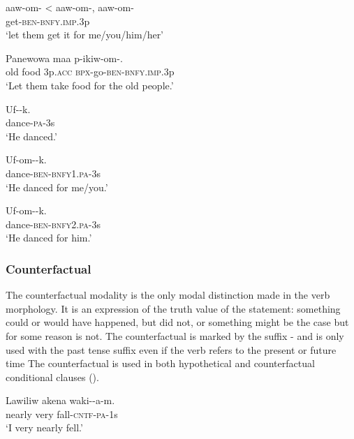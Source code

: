 \ea%
\label{ex:3:x1750}
\gll aaw-om- {{\textless} aaw-om-}, aaw-om- \\
get-\textsc{ben}-\textsc{bnfy}.\textsc{imp}.3p\\
\glt`let them get it for me/you/him/her'
\z

\ea%
\label{ex:3:x445}
\gll Panewowa maa  p-ikiw-om-. \\
old food 3p.\textsc{acc} \textsc{bpx}-go-\textsc{ben}-\textsc{bnfy}.\textsc{imp}.3p\\
\glt`Let them take food for the old people.'
\z

\ea%
\label{ex:3:x494}
\gll Uf--k. \\
dance-\textsc{pa}-3s\\
\glt`He danced.'
\z

\ea%
\label{ex:3:x495}
\gll Uf-om--k. \\
dance-\textsc{ben}-\textsc{bnfy}1.\textsc{pa}-3s\\
\glt`He danced for me/you.'
\z

\ea%
\label{ex:3:x496}
\gll Uf-om--k. \\
dance-\textsc{ben}-\textsc{bnfy}2.\textsc{pa}-3s\\
\glt`He danced for him.'
\z

\subsubsection{Counterfactual}\label{sec:3.8.3.2}
{}
The counterfactual modality is the only modal distinction made in the verb morphology. It is an expression of the truth value of the statement: something could or would have happened, but did not, or something might be the case but for some reason is not. The counterfactual is marked by the suffix \nobreakdash-  and is only used with the past tense suffix even if the verb refers to the present  or future  time The counterfactual is used in both hypothetical and counterfactual conditional clauses (). 

\ea%
\label{ex:3:x234}
\gll Lawiliw akena waki--a-m. \\
nearly very fall-\textsc{cntf}-\textsc{pa}-1s \\
\glt`I very nearly fell.' 
\z

